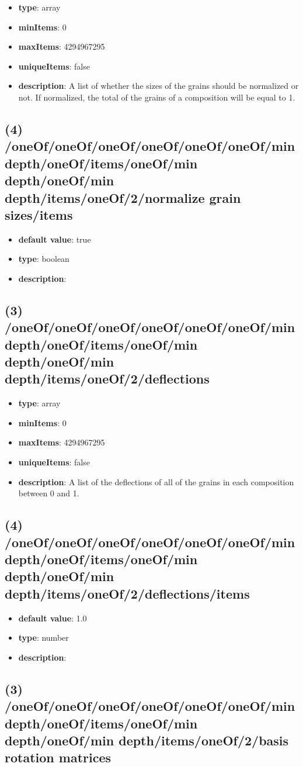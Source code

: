 \begin{itemize}[leftmargin=3em]\item {\bf type}: array
\item {\bf minItems}: 0
\item {\bf maxItems}: 4294967295
\item {\bf uniqueItems}: false
\item {\bf description}: A list of whether the sizes of the grains should be normalized or not. If normalized, the total of the grains of a composition will be equal to 1.
\end{itemize}\subsection{(4) /oneOf/oneOf/oneOf/oneOf/oneOf/oneOf/min depth/oneOf/items/oneOf/min depth/oneOf/min depth/items/oneOf/2/normalize grain sizes/items}
\begin{itemize}[leftmargin=4em]\item {\bf default value}: true
\item {\bf type}: boolean
\item {\bf description}: 
\end{itemize}\subsection{(3) /oneOf/oneOf/oneOf/oneOf/oneOf/oneOf/min depth/oneOf/items/oneOf/min depth/oneOf/min depth/items/oneOf/2/deflections}
\begin{itemize}[leftmargin=3em]\item {\bf type}: array
\item {\bf minItems}: 0
\item {\bf maxItems}: 4294967295
\item {\bf uniqueItems}: false
\item {\bf description}: A list of the deflections of all of the grains in each composition between 0 and 1.
\end{itemize}\subsection{(4) /oneOf/oneOf/oneOf/oneOf/oneOf/oneOf/min depth/oneOf/items/oneOf/min depth/oneOf/min depth/items/oneOf/2/deflections/items}
\begin{itemize}[leftmargin=4em]\item {\bf default value}: 1.0
\item {\bf type}: number
\item {\bf description}: 
\end{itemize}\subsection{(3) /oneOf/oneOf/oneOf/oneOf/oneOf/oneOf/min depth/oneOf/items/oneOf/min depth/oneOf/min depth/items/oneOf/2/basis rotation matrices}
